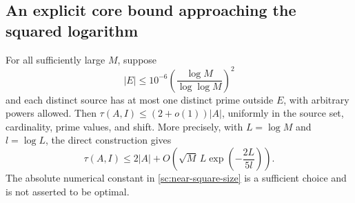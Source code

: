 \subsection{An explicit core bound approaching the squared logarithm}

\begin{corollary}
\label{cor:sc-near-square}
For all sufficiently large \(M\), suppose
\begin{equation}
 |E|\le10^{-6}
       \left(\frac{\log M}{\log\log M}\right)^2
 \label{sc:near-square-size}
\end{equation}
and each distinct source has at most one distinct prime outside
\(E\), with arbitrary powers allowed. Then
\(\tau(A,I)\le(2+o(1))|A|\), uniformly in the source set,
cardinality, prime values, and shift. More precisely, with
\(L=\log M\) and \(l=\log L\), the direct construction gives
\begin{equation}
 \tau(A,I)\le2|A|+
 O\!\left(\sqrt M\,L\exp\left(-\frac{2L}{5l}\right)\right).
 \label{sc:near-square-error}
\end{equation}
The absolute numerical constant in \eqref{sc:near-square-size}
is a sufficient choice and is not asserted to be optimal.
\end{corollary}

